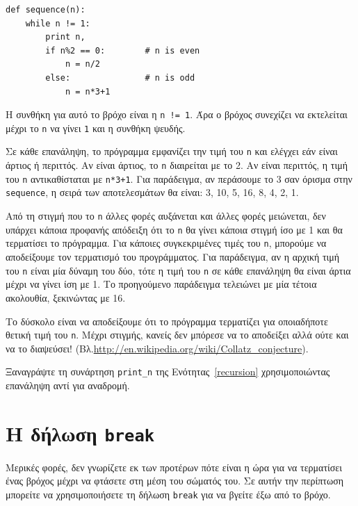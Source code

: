 \documentclass[10pt]{book}
\begin{document}
\begin{verbatim}
def sequence(n):
    while n != 1:
        print n,
        if n%2 == 0:        # n is even
            n = n/2
        else:               # n is odd
            n = n*3+1
\end{verbatim}
%

Η συνθήκη για αυτό το βρόχο είναι η {\tt n != 1}. Άρα ο βρόχος
συνεχίζει να εκτελείται μέχρι το {\tt n} να γίνει {\tt 1} και
η συνθήκη ψευδής.

Σε κάθε επανάληψη, το πρόγραμμα εμφανίζει την τιμή του {\tt n} 
και ελέγχει εάν είναι άρτιος ή περιττός. Αν είναι άρτιος, το {\tt n} 
διαιρείται με το 2. Αν είναι περιττός, η τιμή του {\tt n} αντικαθίσταται
με {\tt n*3+1}. Για παράδειγμα, αν περάσουμε το 3 σαν όρισμα στην
{\tt sequence}, η σειρά των αποτελεσμάτων θα είναι: 3, 10, 5, 16, 8, 4, 2, 1.

Από τη στιγμή που το {\tt n} άλλες φορές αυξάνεται και άλλες φορές
μειώνεται, δεν υπάρχει κάποια προφανής απόδειξη ότι το {\tt n} θα γίνει
κάποια στιγμή ίσο με 1 και θα τερματίσει το πρόγραμμα. Για κάποιες συγκεκριμένες τιμές του {\tt n}, μπορούμε να αποδείξουμε τον τερματισμό του προγράμματος. Για παράδειγμα, αν η αρχική τιμή του {\tt n} είναι μία δύναμη του δύο, τότε η τιμή του {\tt n} σε κάθε επανάληψη θα είναι άρτια μέχρι να γίνει ίση με 1. Το προηγούμενο παράδειγμα τελειώνει με μία τέτοια ακολουθία, ξεκινώντας με 16.

Το δύσκολο είναι να αποδείξουμε ότι το πρόγραμμα τερματίζει για οποιαδήποτε
θετική τιμή του {\tt n}. Μέχρι στιγμής, κανείς δεν μπόρεσε να το αποδείξει αλλά 
ούτε και να το διαψεύσει! (Βλ.\url{http://en.wikipedia.org/wiki/Collatz_conjecture}).
\\
\begin{exercise}

Ξαναγράψτε τη συνάρτηση \verb"print_n" της Ενότητας~\ref{recursion} 
χρησιμοποιώντας επανάληψη αντί για αναδρομή.
\end{exercise}


\section{Η δήλωση \tt break}


Μερικές φορές, δεν γνωρίζετε εκ των προτέρων πότε είναι η ώρα για να τερματίσει ένας βρόχος μέχρι να φτάσετε στη μέση του σώματός του. Σε αυτήν την περίπτωση μπορείτε να χρησιμοποιήσετε τη δήλωση {\tt break} για να βγείτε έξω από το βρόχο.
\end{document}
